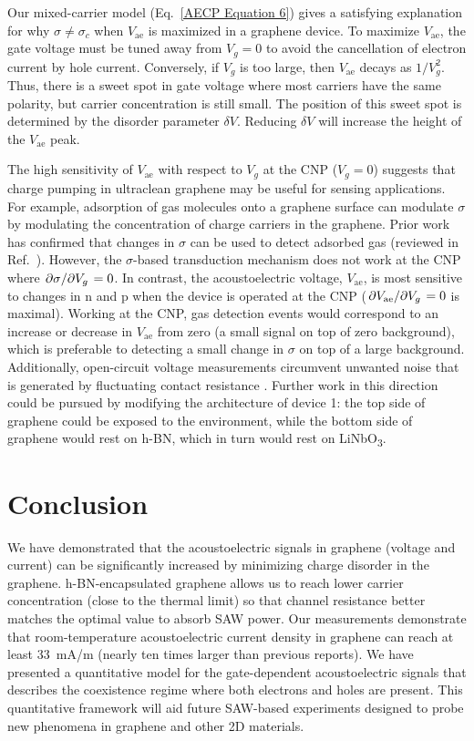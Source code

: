 \documentclass[double,12pt,1in,seploa]{beavtex}
\let\Oldsection\section
\renewcommand{\section}{\FloatBarrier\Oldsection}
\begin{document}
Our mixed-carrier model (Eq.\ \ref{AECP Equation 6}) gives a satisfying explanation for why $\sigma \neq \sigma_c$ when $V_{\mathrm{ae}}$ is maximized in a graphene device. To maximize $V_{\mathrm{ae}}$, the gate voltage must be tuned away from $V_g = 0$ to avoid the cancellation of electron current by hole current. Conversely, if $V_g$ is too large, then $V_{\mathrm{ae}}$ decays as $1/V_g^2$. Thus, there is a sweet spot in gate voltage where most carriers have the same polarity, but carrier concentration is still small. The position of this sweet spot is determined by the disorder parameter $\delta V$. Reducing $\delta V$ will increase the height of the $V_{\mathrm{ae}}$ peak. 

The high sensitivity of $V_{\mathrm{ae}}$ with respect to $V_g$ at the CNP ($V_g = 0$) suggests that charge pumping in ultraclean graphene may be useful for sensing applications. For example, adsorption of gas molecules onto a graphene surface can modulate $\sigma$ by modulating the concentration of charge carriers in the graphene. Prior work has confirmed that changes in $\sigma$ can be used to detect adsorbed gas (reviewed in Ref.\ \cite{yang_gas_2017}). However, the $\sigma$-based transduction mechanism does not work at the CNP where $\pdv*{\sigma}{V_g} = 0$. In contrast, the acoustoelectric voltage, $V_{\mathrm{ae}}$, is most sensitive to changes in n and p when the device is operated at the CNP ($\pdv*{V_{\mathrm{ae}}}{V_g} = 0$ is maximal). Working at the CNP, gas detection events would correspond to an increase or decrease in $V_{\mathrm{ae}}$ from zero (a small signal on top of zero background), which is preferable to detecting a small change in $\sigma$ on top of a large background. Additionally, open-circuit voltage measurements circumvent unwanted noise that is generated by fluctuating contact resistance \cite{schaefer_improved_2020}. Further work in this direction could be pursued by modifying the architecture of device 1: the top side of graphene could be exposed to the environment, while the bottom side of graphene would rest on h-BN, which in turn would rest on LiNbO\textsubscript{3}.


\section{Conclusion}
We have demonstrated that the acoustoelectric signals in graphene (voltage and current) can be significantly increased by minimizing charge disorder in the graphene. h-BN-encapsulated graphene allows us to reach lower carrier concentration (close to the thermal limit) so that channel resistance better matches the optimal value to absorb SAW power. Our measurements demonstrate that room-temperature acoustoelectric current density in graphene can reach at least \SI{33}{\milli\ampere/\meter} (nearly ten times larger than previous reports). We have presented a quantitative model for the gate-dependent acoustoelectric signals that describes the coexistence regime where both electrons and holes are present. This quantitative framework will aid future SAW-based experiments designed to probe new phenomena in graphene and other 2D materials.
\end{document}

